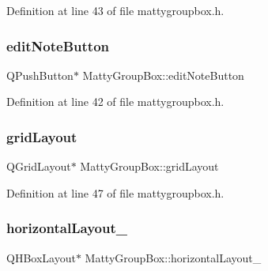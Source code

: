 Definition at line 43 of file mattygroupbox.\+h.

\hypertarget{classMattyGroupBox_a3237eef2287c1b2fcff14d226ef9116d}{}\label{classMattyGroupBox_a3237eef2287c1b2fcff14d226ef9116d} 
\subsubsection{\texorpdfstring{edit\+Note\+Button}{editNoteButton}}
{\footnotesize\ttfamily Q\+Push\+Button$\ast$ Matty\+Group\+Box\+::edit\+Note\+Button\hspace{0.3cm}{\ttfamily [private]}}



Definition at line 42 of file mattygroupbox.\+h.

\hypertarget{classMattyGroupBox_a02436c3690d2007eb0cba523bcb668ea}{}\label{classMattyGroupBox_a02436c3690d2007eb0cba523bcb668ea} 
\subsubsection{\texorpdfstring{grid\+Layout}{gridLayout}}
{\footnotesize\ttfamily Q\+Grid\+Layout$\ast$ Matty\+Group\+Box\+::grid\+Layout\hspace{0.3cm}{\ttfamily [private]}}



Definition at line 47 of file mattygroupbox.\+h.

\hypertarget{classMattyGroupBox_a5d52dd2e01ba1a5d155e056ea438f142}{}\label{classMattyGroupBox_a5d52dd2e01ba1a5d155e056ea438f142} 
\subsubsection{\texorpdfstring{horizontal\+Layout\+\_}{horizontalLayout\_1}}
{\footnotesize\ttfamily Q\+H\+Box\+Layout$\ast$ Matty\+Group\+Box\+::horizontal\+Layout\+\_\hspace{0.3cm}{\ttfamily [private]}}



